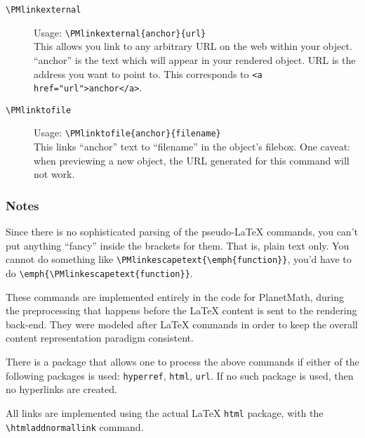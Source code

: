 \begin{description}
\item[\texttt{\textbackslash{}PMlinkexternal}]
 Usage: \texttt{\textbackslash{}PMlinkexternal\{anchor\}\{url\}}\\
 This allows you link to any arbitrary URL on the web within your object. ``anchor'' is the text which will appear in your rendered object. URL is the address you want to point to. This corresponds to \texttt{<a href="url">anchor</a>}.
\item[\texttt{\textbackslash{}PMlinktofile}]
 Usage: \texttt{\textbackslash{}PMlinktofile\{anchor\}\{filename\}}\\
 This links ``anchor'' text to ``filename'' in the object's filebox. One caveat: when previewing a new object, the URL generated for this command will not work.
\end{description}

\subsubsection*{Notes}
Since there is no sophisticated parsing of the pseudo-\LaTeX{} commands, you can't put anything ``fancy'' inside the brackets for them. That is, plain text only. You cannot do something like \texttt{\textbackslash{}PMlinkescapetext\{\textbackslash{}emph\{function\}\}}, you'd have to do \texttt{\textbackslash{}emph\{\textbackslash{}PMlinkescapetext\{function\}\}}.

These commands are implemented entirely in the code for PlanetMath, during the preprocessing that happens before the \LaTeX{} content is sent to the rendering back-end. They were modeled after \LaTeX{} commands in order to keep the overall content representation paradigm consistent.

There is a package \texttt{}
that allows one to process the above commands if either of the following packages is used: \texttt{hyperref}, \texttt{html}, \texttt{url}. If no such package is used, then no hyperlinks are created.


All links are implemented using the actual \LaTeX{} \texttt{html} package, with the \texttt{\textbackslash{}htmladdnormallink} command.
